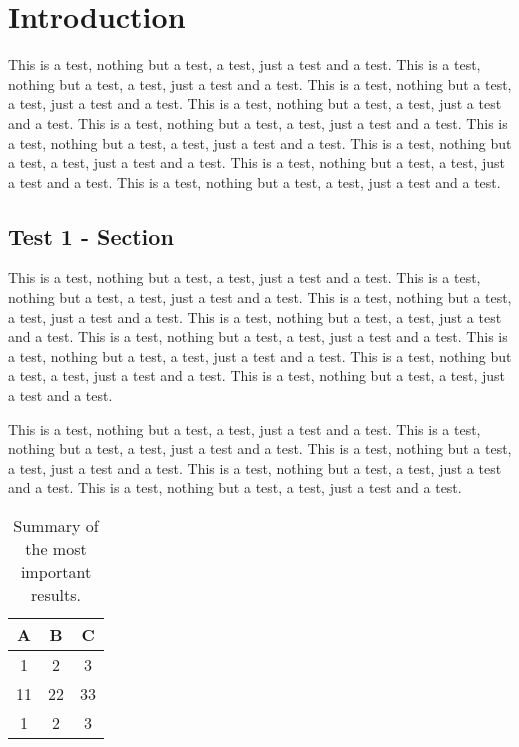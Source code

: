 \chapter{Introduction}

This is a test, nothing but a test, a test, just a test and a test.
This is a test, nothing but a test, a test, just a test and a test.
This is a test, nothing but a test, a test, just a test and a test.
This is a test, nothing but a test, a test, just a test and a test.
This is a test, nothing but a test, a test, just a test and a test.
This is a test, nothing but a test, a test, just a test and a test.
This is a test, nothing but a test, a test, just a test and a test.
This is a test, nothing but a test, a test, just a test and a test.
This is a test, nothing but a test, a test, just a test and a test.

\section{Test 1 - Section}

This is a test, nothing but a test, a test, just a test and a test.
This is a test, nothing but a test, a test, just a test and a test.
This is a test, nothing but a test, a test, just a test and a test.
This is a test, nothing but a test, a test, just a test and a test.
This is a test, nothing but a test, a test, just a test and a test.
This is a test, nothing but a test, a test, just a test and a test.
This is a test, nothing but a test, a test, just a test and a test.
This is a test, nothing but a test, a test, just a test and a test.

This is a test, nothing but a test, a test, just a test and a test.
This is a test, nothing but a test, a test, just a test and a test.
This is a test, nothing but a test, a test, just a test and a test.
This is a test, nothing but a test, a test, just a test and a test.
This is a test, nothing but a test, a test, just a test and a test.

%
\begin{table}[tbh]
\caption{Summary of the most important results.}
%
\begin{center}
  \begin{tabular}{|c|cc|}
    \hline
    A   & B   & C  \\
    \hline
    1   & 2   & 3   \\
    11  & 22  & 33  \\
    1   & 2   & 3   \\
    \hline
  \end{tabular}
\end{center}
\label{Tab:table1}
\end{table}


